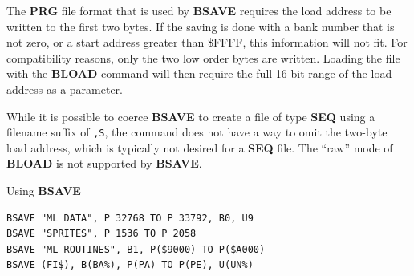 \begin{description}[leftmargin=2cm,style=nextline]
   The {\bf PRG} file format that is used by {\bf BSAVE}
   requires the load address to be written to the first two bytes.
   If the saving is done with a bank number that is not zero,
   or a start address greater than \$FFFF, this information will not
   fit. For compatibility reasons, only the two low order bytes
   are written. Loading the file with the {\bf BLOAD} command will then
   require the full 16-bit range of the load address as a parameter.

   While it is possible to coerce {\bf BSAVE} to create a file of type {\bf SEQ} using a filename suffix of \texttt{,S}, the command does not have a way to omit the two-byte load address, which is typically not desired for a {\bf SEQ} file. The ``raw'' mode of {\bf BLOAD} is not supported by {\bf BSAVE}.

\item [Examples:] Using {\bf BSAVE}
\begin{tcolorbox}[colback=black,coltext=white]
\verbatimfont{\codefont}
\begin{verbatim}
BSAVE "ML DATA", P 32768 TO P 33792, B0, U9
BSAVE "SPRITES", P 1536 TO P 2058
BSAVE "ML ROUTINES", B1, P($9000) TO P($A000)
BSAVE (FI$), B(BA%), P(PA) TO P(PE), U(UN%)
\end{verbatim}
\end{tcolorbox}
\end{description}


\newpage
